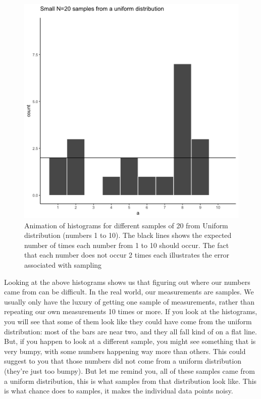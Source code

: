 \documentclass[]{book}
\begin{document}
\begin{figure}
\centering
\includegraphics{gifs/sampleUnifExpected-1.gif}
\caption{\label{fig:5expectedUnif}Animation of histograms for different samples of 20 from Uniform distribution (numbers 1 to 10). The black lines shows the expected number of times each number from 1 to 10 should occur. The fact that each number does not occur 2 times each illustrates the error associated with sampling}
\end{figure}

Looking at the above histograms shows us that figuring out where our numbers came from can be difficult. In the real world, our measurements are samples. We usually only have the luxury of getting one sample of measurements, rather than repeating our own measurements 10 times or more. If you look at the histograms, you will see that some of them look like they could have come from the uniform distribution: most of the bars are near two, and they all fall kind of on a flat line. But, if you happen to look at a different sample, you might see something that is very bumpy, with some numbers happening way more than others. This could suggest to you that those numbers did not come from a uniform distribution (they're just too bumpy). But let me remind you, all of these samples came from a uniform distribution, this is what samples from that distribution look like. This is what chance does to samples, it makes the individual data points noisy.
\end{document}
